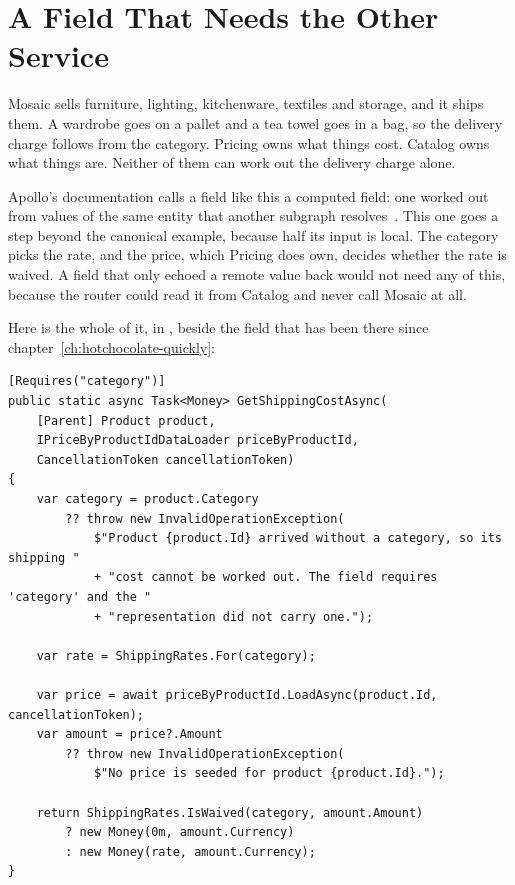 \section{A Field That Needs the Other Service}
\label{sec:ch11-a-field-from-the-other-service}
%

Mosaic sells furniture, lighting, kitchenware, textiles and storage, and it
ships them. A wardrobe goes on a pallet and a tea towel goes in a bag, so the
delivery charge follows from the category. Pricing owns what things cost.
Catalog owns what things are. Neither of them can work out the delivery charge
alone.

%
Apollo's documentation calls a field like this a computed field: one worked out
from values of the same entity that another subgraph
resolves~\autocite{apollo2026contributefields}. This one goes a step beyond the
canonical example, because half its input is local. The category picks the
rate, and the price, which Pricing does own, decides whether the rate is
waived. A field that only echoed a remote value back would not need any of
this, because the router could read it from Catalog and never call Mosaic at
all.

Here is the whole of it, in , beside
the  field that has been there since
chapter~\ref{ch:hotchocolate-quickly}:

\begin{verbatim}
[Requires("category")]
public static async Task<Money> GetShippingCostAsync(
    [Parent] Product product,
    IPriceByProductIdDataLoader priceByProductId,
    CancellationToken cancellationToken)
{
    var category = product.Category
        ?? throw new InvalidOperationException(
            $"Product {product.Id} arrived without a category, so its shipping "
            + "cost cannot be worked out. The field requires 'category' and the "
            + "representation did not carry one.");

    var rate = ShippingRates.For(category);

    var price = await priceByProductId.LoadAsync(product.Id, cancellationToken);
    var amount = price?.Amount
        ?? throw new InvalidOperationException(
            $"No price is seeded for product {product.Id}.");

    return ShippingRates.IsWaived(category, amount.Amount)
        ? new Money(0m, amount.Currency)
        : new Money(rate, amount.Currency);
}
\end{verbatim}

